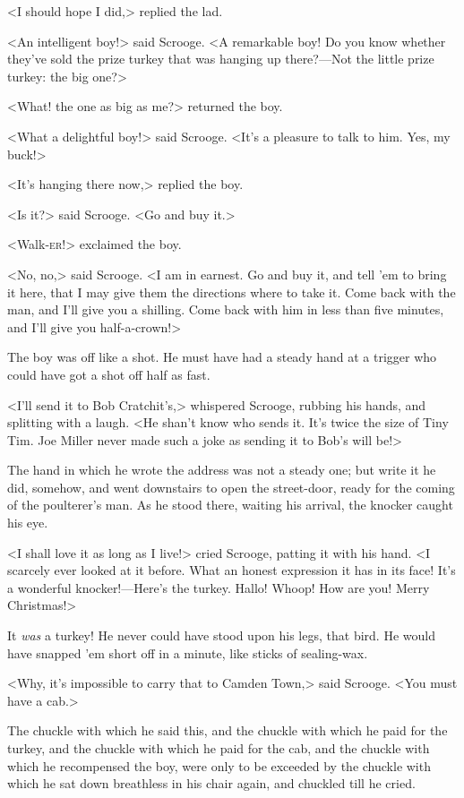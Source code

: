 <I should hope I did,> replied the lad.

<An intelligent boy!> said Scrooge. <A remarkable boy! Do you know whether they've sold the prize turkey that was hanging up there?—Not the little prize turkey: the big one?>

<What! the one as big as me?> returned the boy.

<What a delightful boy!> said Scrooge. <It's a pleasure to talk to him. Yes, my buck!>

<It's hanging there now,> replied the boy.

<Is it?> said Scrooge. <Go and buy it.>

<Walk-\textsc{er}!> exclaimed the boy.

<No, no,> said Scrooge. <I am in earnest. Go and buy it, and tell 'em to bring it here, that I may give them the directions where to take it. Come back with the man, and I'll give you a shilling. Come back with him in less than five minutes, and I'll give you half-a-crown!>

The boy was off like a shot. He must have had a steady hand at a trigger who could have got a shot off half as fast.

<I'll send it to Bob Cratchit's,> whispered Scrooge, rubbing his hands, and splitting with a laugh. <He shan't know who sends it. It's twice the size of Tiny Tim. Joe Miller never made such a joke as sending it to Bob's will be!>

The hand in which he wrote the address was not a steady one; but write it he did, somehow, and went downstairs to open the street-door, ready for the coming of the poulterer's man. As he stood there, waiting his arrival, the knocker caught his eye.

<I shall love it as long as I live!> cried Scrooge, patting it with his hand. <I scarcely ever looked at it before. What an honest expression it has in its face! It's a wonderful knocker!—Here's the turkey. Hallo! Whoop! How are you! Merry Christmas!>

It \textit{was} a turkey! He never could have stood upon his legs, that bird. He would have snapped 'em short off in a minute, like sticks of sealing-wax.

<Why, it's impossible to carry that to Camden Town,> said Scrooge. <You must have a cab.>

The chuckle with which he said this, and the chuckle with which he paid for the turkey, and the chuckle with which he paid for the cab, and the chuckle with which he recompensed the boy, were only to be exceeded by the chuckle with which he sat down breathless in his chair again, and chuckled till he cried.

